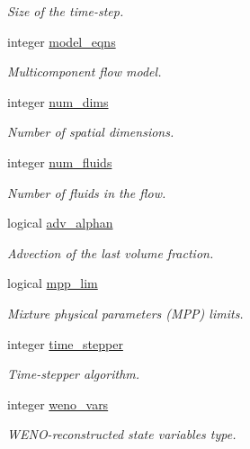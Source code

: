 \begin{DoxyCompactItemize}
\begin{DoxyCompactList}\small\item\em Size of the time-\/step. \end{DoxyCompactList}\item 
integer \hyperlink{namespacem__global__parameters_a6cf2e92cfc3b519fb6da6fe9e88fab31}{model\+\_\+eqns}
\begin{DoxyCompactList}\small\item\em Multicomponent flow model. \end{DoxyCompactList}\item 
integer \hyperlink{namespacem__global__parameters_a76e251296a28212df87bf9f653ff9a3b}{num\+\_\+dims}
\begin{DoxyCompactList}\small\item\em Number of spatial dimensions. \end{DoxyCompactList}\item 
integer \hyperlink{namespacem__global__parameters_a2f0b96a5aef3925aa7e3cc816754e17e}{num\+\_\+fluids}
\begin{DoxyCompactList}\small\item\em Number of fluids in the flow. \end{DoxyCompactList}\item 
logical \hyperlink{namespacem__global__parameters_abebd95d9d0271fbda40f47f75a2d829b}{adv\+\_\+alphan}
\begin{DoxyCompactList}\small\item\em Advection of the last volume fraction. \end{DoxyCompactList}\item 
logical \hyperlink{namespacem__global__parameters_adc35ba450a192812db36f1d6659d64e6}{mpp\+\_\+lim}
\begin{DoxyCompactList}\small\item\em Mixture physical parameters (M\+PP) limits. \end{DoxyCompactList}\item 
integer \hyperlink{namespacem__global__parameters_aeb707079ac4a6d4135c3b7121a8a3232}{time\+\_\+stepper}
\begin{DoxyCompactList}\small\item\em Time-\/stepper algorithm. \end{DoxyCompactList}\item 
integer \hyperlink{namespacem__global__parameters_aa254277cf111be2267a61b7884279844}{weno\+\_\+vars}
\begin{DoxyCompactList}\small\item\em W\+E\+N\+O-\/reconstructed state variables type. \end{DoxyCompactList}\item 

\end{DoxyCompactItemize}
